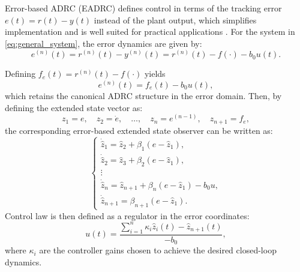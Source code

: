     Error-based ADRC (EADRC) defines control in terms of the tracking error $e(t) = r(t) - y(t)$ instead of the plant output, which simplifies implementation and is well suited for practical applications \citep{Madonski:2019}. For the system in \eqref{eq:general_system}, the error dynamics are given by:
    \begin{equation}
        e^{(n)}(t) = r^{(n)}(t) - y^{(n)}(t) = r^{(n)}(t) - f(\cdot) - b_0 u(t).
    \end{equation}
    
    Defining $f_e(t) = r^{(n)}(t) - f(\cdot)$ yields
    \begin{equation}
        e^{(n)}(t) = f_e(t) - b_0 u(t),
    \label{eq:error_siso}
    \end{equation}
    which retains the canonical ADRC structure in the error domain. Then, by defining the extended state vector as:
    \begin{equation}
        z_1 = e,\quad z_2 = \dot{e},\quad \dots,\quad z_n = e^{(n-1)},\quad z_{n+1} = f_e,
    \end{equation}
    the corresponding error-based extended state observer can be written as:
    \begin{equation}
    \begin{cases}
        \dot{\hat{z}}_1 = \hat{z}_2 + \beta_1 (e - \hat{z}_1), \\
        \dot{\hat{z}}_2 = \hat{z}_3 + \beta_2 (e - \hat{z}_1), \\
        \vdots \\
        \dot{\hat{z}}_n = \hat{z}_{n+1} + \beta_n (e - \hat{z}_1) - b_0 u, \\
        \dot{\hat{z}}_{n+1} = \beta_{n+1} (e - \hat{z}_1).
    \end{cases}
    \label{eq:eeso_n}
    \end{equation}
    Control law is then defined as a regulator in the error coordinates:
    \begin{equation}
        u(t) = \frac{\sum_{i=1}^{n} \kappa_i \hat{z}_i(t) - \hat{z}_{n+1}(t)}{-b_0},
    \label{eq:control_law_error}
    \end{equation}
    where $\kappa_i$ are the controller gains chosen to achieve the desired closed-loop dynamics.

